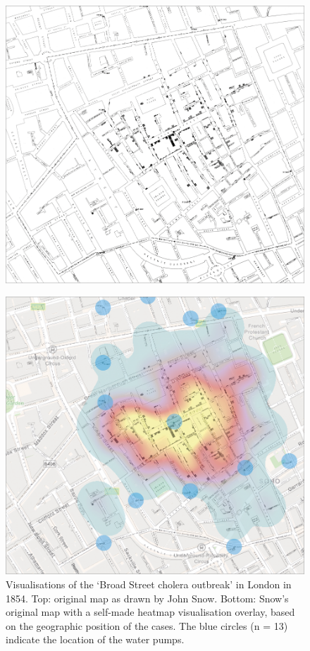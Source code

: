 \documentclass[
]{book}
\begin{document}
\begin{figure}

{\centering \includegraphics[width=1\linewidth]{images/01-01a} 

}

\end{figure}
\begin{figure}

{\centering \includegraphics[width=1\linewidth]{images/01-01b} 

}

\caption{Visualisations of the ‘Broad Street cholera outbreak’ in London in 1854. Top: original map as drawn by John Snow. Bottom: Snow’s original map with a self-made heatmap visualisation overlay, based on the geographic position of the cases. The blue circles (n = 13) indicate the location of the water pumps.}\label{fig:intro-1}
\end{figure}
\end{document}
